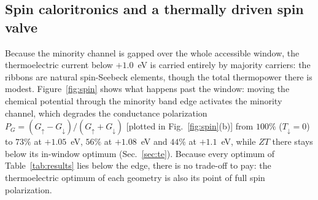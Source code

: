 \documentclass[preprint,12pt]{elsarticle}
\begin{document}
\subsection{Spin caloritronics and a thermally driven spin valve}
\label{sec:valve}
\label{sec:polar}
Because the minority channel is gapped over the whole accessible window, the thermoelectric
current below $+1.0$~eV is carried entirely by majority carriers: the ribbons are natural
spin-Seebeck elements, though the total thermopower there is modest.
Figure~\ref{fig:spin} shows what happens past the window: moving the chemical potential
through the minority band edge activates the minority channel, which degrades the
conductance polarization $P_G=(G_\uparrow-G_\downarrow)/(G_\uparrow+G_\downarrow)$ [plotted in
Fig.~\ref{fig:spin}(b)] from $100\%$ ($T_\downarrow=0$) to $73\%$ at $+1.05$~eV, $56\%$ at
$+1.08$~eV and $44\%$ at $+1.1$~eV, while $ZT$ there stays below its in-window optimum
(Sec.~\ref{sec:te}). Because every optimum of Table~\ref{tab:results} lies below the edge,
there is no trade-off to pay: the thermoelectric optimum of each geometry is also its point of
full spin polarization.
\end{document}
